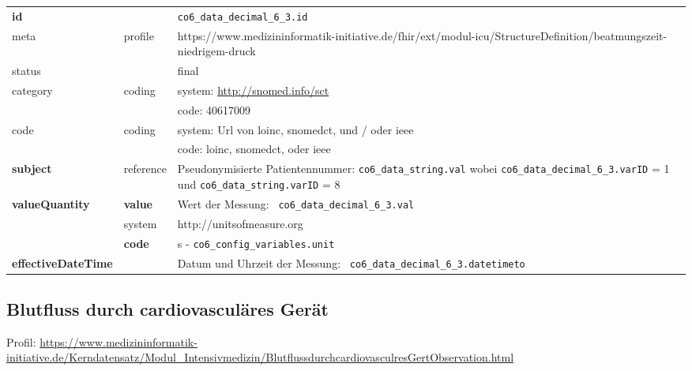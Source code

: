 \begin{longtable}{|l|l|p{7.5cm}|}
	\hline
	\rowcolor{lightgray} \multicolumn{3}{|l|}{Data Mapping (inhaltlich)} \\ \hline
	\textbf{id} &  & \texttt{co6\_data\_decimal\_6\_3.id} \\ \hline
	meta & profile & https://www.medizininformatik-initiative.de/fhir/ext/modul-icu/StructureDefinition/beatmungszeit-niedrigem-druck \\ \hline 
	status &  & final   \\ \hline 
	category & coding & system: \url{http://snomed.info/sct} \\
	\cline{3-3}
	& & code: 40617009 \\ \hline
	code & coding & system: Url von \ac{loinc}, \ac{snomedct}, und / oder \ac{ieee} \\ 
	\cline{3-3} 
	&  & code: \ac{loinc}, \ac{snomedct}, oder \ac{ieee} \\ \hline
	\textbf{subject} & reference & Pseudonymisierte Patientennummer: \texttt{co6\_data\_string.val} wobei \texttt{co6\_data\_decimal\_6\_3.varID} = 1 und \texttt{co6\_data\_string.varID} = 8 \\ \hline
	\textbf{valueQuantity}  & \textbf{value} & Wert der Messung: \texttt{
		co6\_data\_decimal\_6\_3.val} \\
	\cline{2-3}
	& system & http://unitsofmeasure.org \\
	\cline{2-3}
	& \textbf{code} & s - \texttt{co6\_config\_variables.unit}
	\\ \hline
	\textbf{effectiveDateTime}  & & Datum und Uhrzeit der Messung: \texttt{
		co6\_data\_decimal\_6\_3.datetimeto} \\
	\hline
\end{longtable}


\subsection{Blutfluss durch cardiovasculäres Gerät} 

Profil: \url{https://www.medizininformatik-initiative.de/Kerndatensatz/Modul_Intensivmedizin/BlutflussdurchcardiovasculresGertObservation.html}

